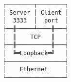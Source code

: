 \documentclass[varwidth,crop]{standalone}
\begin{document}
\begin{verbatim}
┌────────┬────────┐
│ Server │ Client │
│  3333  │  port  │ 
├──╫─────┴────╫───┤
│  ║    TCP   ║   │
├──╫──────────╫───┤
│  ╚═Loopback═╝   │
├─────────────────┤
│    Ethernet     │
└─────────────────┘
\end{verbatim}
\end{document}
